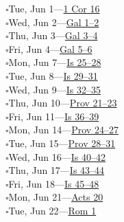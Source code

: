 \hypertarget{rp-2027-06-01}{}\noindent$\square$\enspace Tue, Jun 1\enspace---\enspace \hyperlink{ch-1corinthians-16}{1 Cor 16}\\
\hypertarget{rp-2027-06-02}{}\noindent$\square$\enspace Wed, Jun 2\enspace---\enspace \hyperlink{ch-galatians-1}{Gal 1--2}\\
\hypertarget{rp-2027-06-03}{}\noindent$\square$\enspace Thu, Jun 3\enspace---\enspace \hyperlink{ch-galatians-3}{Gal 3--4}\\
\hypertarget{rp-2027-06-04}{}\noindent$\square$\enspace Fri, Jun 4\enspace---\enspace \hyperlink{ch-galatians-5}{Gal 5--6}\\
\hypertarget{rp-2027-06-07}{}\noindent$\square$\enspace Mon, Jun 7\enspace---\enspace \hyperlink{ch-isaiah-25}{Is 25--28}\\
\hypertarget{rp-2027-06-08}{}\noindent$\square$\enspace Tue, Jun 8\enspace---\enspace \hyperlink{ch-isaiah-29}{Is 29--31}\\
\hypertarget{rp-2027-06-09}{}\noindent$\square$\enspace Wed, Jun 9\enspace---\enspace \hyperlink{ch-isaiah-32}{Is 32--35}\\
\hypertarget{rp-2027-06-10}{}\noindent$\square$\enspace Thu, Jun 10\enspace---\enspace \hyperlink{ch-proverbs-21}{Prov 21--23}\\
\hypertarget{rp-2027-06-11}{}\noindent$\square$\enspace Fri, Jun 11\enspace---\enspace \hyperlink{ch-isaiah-36}{Is 36--39}\\
\hypertarget{rp-2027-06-14}{}\noindent$\square$\enspace Mon, Jun 14\enspace---\enspace \hyperlink{ch-proverbs-24}{Prov 24--27}\\
\hypertarget{rp-2027-06-15}{}\noindent$\square$\enspace Tue, Jun 15\enspace---\enspace \hyperlink{ch-proverbs-28}{Prov 28--31}\\
\hypertarget{rp-2027-06-16}{}\noindent$\square$\enspace Wed, Jun 16\enspace---\enspace \hyperlink{ch-isaiah-40}{Is 40--42}\\
\hypertarget{rp-2027-06-17}{}\noindent$\square$\enspace Thu, Jun 17\enspace---\enspace \hyperlink{ch-isaiah-43}{Is 43--44}\\
\hypertarget{rp-2027-06-18}{}\noindent$\square$\enspace Fri, Jun 18\enspace---\enspace \hyperlink{ch-isaiah-45}{Is 45--48}\\
\hypertarget{rp-2027-06-21}{}\noindent$\square$\enspace Mon, Jun 21\enspace---\enspace \hyperlink{ch-acts-20}{Acts 20}\\
\hypertarget{rp-2027-06-22}{}\noindent$\square$\enspace Tue, Jun 22\enspace---\enspace \hyperlink{ch-romans-1}{Rom 1}\\
